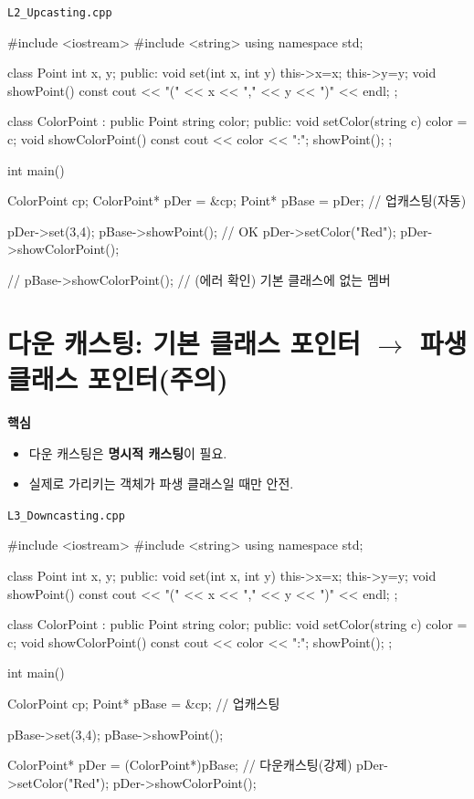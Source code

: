 \documentclass[11pt,a4paper]{article}
\newcommand{\filetag}[1]{\texttt{\color{Accent}#1}}
\begin{document}
\noindent\filetag{L2\_Upcasting.cpp}
\begin{cppcode}
#include <iostream>
#include <string>
using namespace std;

class Point {
    int x, y;
public:
    void set(int x, int y) { this->x=x; this->y=y; }
    void showPoint() const { cout << "(" << x << "," << y << ")" << endl; }
};

class ColorPoint : public Point {
    string color;
public:
    void setColor(string c) { color = c; }
    void showColorPoint() const { cout << color << ":"; showPoint(); }
};

int main() {
    ColorPoint cp;
    ColorPoint* pDer = &cp;
    Point* pBase = pDer; // 업캐스팅(자동)

    pDer->set(3,4);
    pBase->showPoint(); // OK
    pDer->setColor("Red");
    pDer->showColorPoint();

    // pBase->showColorPoint(); // (에러 확인) 기본 클래스에 없는 멤버
}
\end{cppcode}

\section{다운 캐스팅: 기본 클래스 포인터 $\rightarrow$ 파생 클래스 포인터(주의)}
\begin{GoalBox}
\textbf{핵심}
\begin{itemize}[leftmargin=18pt]
  \item 다운 캐스팅은 \textbf{명시적 캐스팅}이 필요.
  \item 실제로 가리키는 객체가 파생 클래스일 때만 안전.
\end{itemize}
\end{GoalBox}

\noindent\filetag{L3\_Downcasting.cpp}
\begin{cppcode}
#include <iostream>
#include <string>
using namespace std;

class Point {
    int x, y;
public:
    void set(int x, int y) { this->x=x; this->y=y; }
    void showPoint() const { cout << "(" << x << "," << y << ")" << endl; }
};

class ColorPoint : public Point {
    string color;
public:
    void setColor(string c) { color = c; }
    void showColorPoint() const { cout << color << ":"; showPoint(); }
};

int main() {
    ColorPoint cp;
    Point* pBase = &cp; // 업캐스팅

    pBase->set(3,4);
    pBase->showPoint();

    ColorPoint* pDer = (ColorPoint*)pBase; // 다운캐스팅(강제)
    pDer->setColor("Red");
    pDer->showColorPoint();
}
\end{cppcode}
\end{document}

